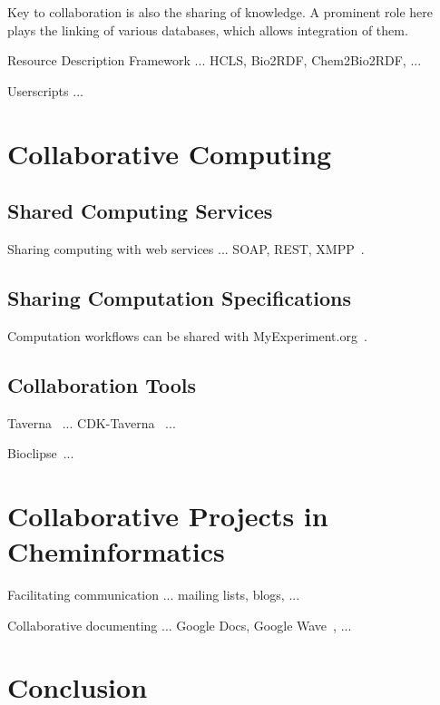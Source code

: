 \documentclass[12pt]{book}
\begin{document}
Key to collaboration is also the sharing of knowledge. A prominent role here
plays the linking of various databases, which allows integration of them.

Resource Description Framework ... HCLS, Bio2RDF, Chem2Bio2RDF, ...

Userscripts ...

\section{Collaborative Computing}

\subsection{Shared Computing Services}

Sharing computing with web services ... SOAP, REST, XMPP~\cite{Wagener2009}.

\subsection{Sharing Computation Specifications}

Computation workflows can be shared with MyExperiment.org~\cite{Goble2010}.

\subsection{Collaboration Tools}

Taverna~\cite{Oinn2004} ... CDK-Taverna~\cite{Kuhn2010} ...

Bioclipse~\cite{Spjuth2009,Spjuth2007}...

\section{Collaborative Projects in Cheminformatics}

Facilitating communication ... mailing lists, blogs, ...

Collaborative documenting ... Google Docs, Google Wave~\cite{Neylon2009}, ...

\section{Conclusion}



\end{document}
